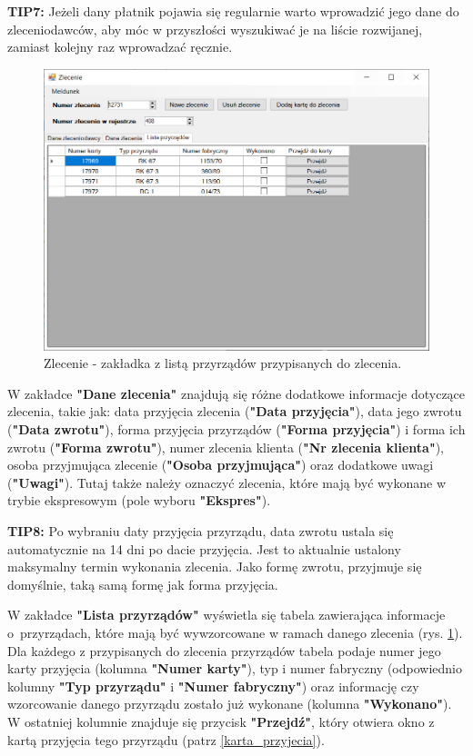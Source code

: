 \textbf{TIP7:} Jeżeli dany płatnik pojawia się regularnie warto wprowadzić jego dane do zleceniodawców, aby móc w przyszłości wyszukiwać je na liście rozwijanej, zamiast kolejny raz wprowadzać ręcznie.

\begin{figure}[htb]
	\centering
	\includegraphics[width=\columnwidth]{obrazki/Biuro/zlecenie/zlecenie_lista.png}
	\caption{Zlecenie - zakładka z listą przyrządów przypisanych do zlecenia.}
	\label{zlecenieLista}
\end{figure}

W zakładce \textbf{"Dane zlecenia"} znajdują się różne dodatkowe informacje dotyczące zlecenia, takie jak: data przyjęcia zlecenia (\textbf{"Data przyjęcia"}), data jego zwrotu (\textbf{"Data zwrotu"}), forma przyjęcia przyrządów (\textbf{"Forma przyjęcia"}) i forma ich zwrotu (\textbf{"Forma zwrotu"}), numer zlecenia klienta (\textbf{"Nr zlecenia klienta"}), osoba przyjmująca zlecenie (\textbf{"Osoba przyjmująca"}) oraz dodatkowe uwagi (\textbf{"Uwagi"}). Tutaj także należy oznaczyć zlecenia, które mają być wykonane w trybie ekspresowym (pole wyboru \textbf{"Ekspres"}). 

\textbf{TIP8:} Po wybraniu daty przyjęcia przyrządu, data zwrotu ustala się automatycznie na 14 dni po dacie przyjęcia. Jest to aktualnie ustalony maksymalny termin wykonania zlecenia. Jako formę zwrotu, przyjmuje się domyślnie, taką samą formę jak forma przyjęcia.

W zakładce \textbf{"Lista przyrządów"} wyświetla się tabela zawierająca informacje o~przyrządach, które mają być wywzorcowane w ramach danego zlecenia (rys. \ref{zlecenieLista}). Dla każdego z przypisanych do zlecenia przyrządów tabela podaje numer jego karty przyjęcia (kolumna \textbf{"Numer karty"}), typ i numer fabryczny (odpowiednio kolumny \textbf{"Typ przyrządu"} i \textbf{"Numer fabryczny"}) oraz informację czy wzorcowanie danego przyrządu zostało już wykonane (kolumna \textbf{"Wykonano"}). W ostatniej kolumnie znajduje się przycisk \textbf{"Przejdź"}, który otwiera okno z kartą przyjęcia tego przyrządu (patrz \ref{karta_przyjecia}).

